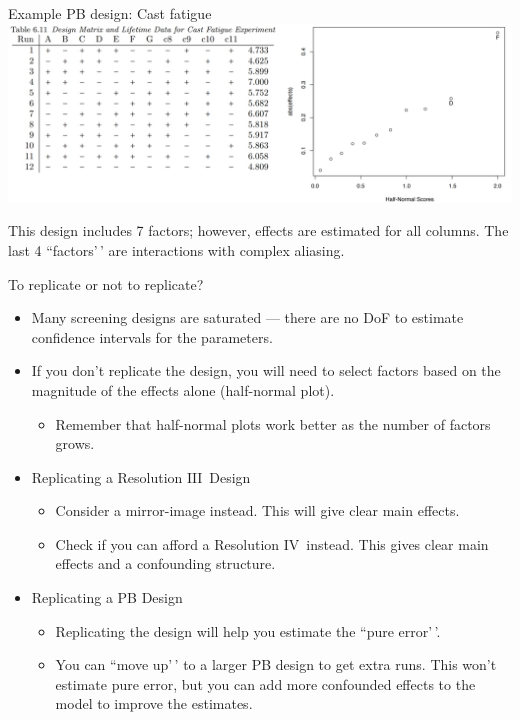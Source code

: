 \documentclass[
  10pt,
  ignorenonframetext,
]{beamer}
\providecommand{\tightlist}{%
  \setlength{\itemsep}{0pt}\setlength{\parskip}{0pt}}
\begin{document}
\begin{frame}{Example PB design: Cast fatigue}
\protect\hypertarget{example-pb-design-cast-fatigue}{}
\includegraphics{figures/altfact2.png}

This design includes 7 factors; however, effects are estimated for all
columns. The last 4 ``factors'\,' are interactions with complex
aliasing.
\end{frame}

\begin{frame}{To replicate or not to replicate?}
\protect\hypertarget{to-replicate-or-not-to-replicate}{}
\begin{itemize}
\tightlist
\item
  Many screening designs are saturated --- there are no DoF to estimate
  confidence intervals for the parameters.
\item
  If you don't replicate the design, you will need to select factors
  based on the magnitude of the effects alone (half-normal plot).

  \begin{itemize}
  \tightlist
  \item
    Remember that half-normal plots work better as the number of factors
    grows.
  \end{itemize}
\end{itemize}

\pause

\begin{itemize}
\tightlist
\item
  Replicating a Resolution \ensuremath{\mathrm{III}}~Design

  \begin{itemize}
  \tightlist
  \item
    Consider a mirror-image instead. This will give clear main effects.
  \item
    Check if you can afford a Resolution
    \ensuremath{\mathrm{IV}}~instead. This gives clear main effects and
    a confounding structure.
  \end{itemize}
\item
  Replicating a PB Design

  \begin{itemize}
  \tightlist
  \item
    Replicating the design will help you estimate the ``pure error'\,'.
  \item
    You can ``move up'\,' to a larger PB design to get extra runs. This
    won't estimate pure error, but you can add more confounded effects
    to the model to improve the estimates.
  \end{itemize}
\end{itemize}
\end{frame}
\end{document}
